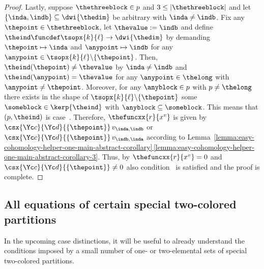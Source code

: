 \documentclass[pdftex]{sigma}
\numberwithin{equation}{section}
\begin{document}
{\begin{proof}
                                 Lastly, suppose  $\thethreeblock\in\thepartition$ and $3\leq|\thethreeblock|$ and let  $\{\inda,\indb\}\subseteq \dwi{\thedim}$  be arbitrary with $\inda\neq \indb$. Fix any $\thepoint\in\thethreeblock$, let $\thevalue:= \indb$ and define $\theind\funcdef\tsopx{\inlen}{\outlen}\to\dwi{\thedim}$ by demanding $\thepoint\mapsto \inda$ and $\anypoint\mapsto \indb$ for any $\anypoint\in\tsopx{\inlen}{\outlen}\backslash \{\thepoint\}$. Then, $\theind(\thepoint)\neq \thevalue$ by $\inda\neq\indb$ and $\theind(\anypoint)=\thevalue$ for any $\anypoint\in\thelong$ with $\anypoint\neq\thepoint$. Moreover, for any $\anyblock\in\thepartition$ with $\thepartition\neq\thelong$ there exists in the shape of $\tsopx{\inlen}{\outlen}\backslash \{\thepoint\}$ some   $\someblock\in\kerp{\theind}$ with $\anyblock\subseteq\someblock$. This means that $(\thepartition,\theind)$ is case~\scenariothree{}. Therefore, $\thefuncxx{\somerel}{\thetuple}$ is given by $\csx{\incol}{\outcol}{\{\thepoint\}}\,\thematx{\inda}{\indb}$ or      $\csx{\incol}{\outcol}{\{\thepoint\}}\,\thematx{\indb}{\inda}$ according to  Lem\-ma~\hyperref[lemma:easy-cohomology-helper-one-main-abstract-corollary-3]{\ref*{lemma:easy-cohomology-helper-one-main-abstract-corollary}\,\ref*{lemma:easy-cohomology-helper-one-main-abstract-corollary-3}}. Thus,  by $\thefuncxx{\somerel}{\thetuple}= 0$ and $\csx{\incol}{\outcol}{\{\thepoint\}}\neq 0$ also  condition~\conditionthree{} is satisfied and the proof is complete.
  \end{proof}
}



\subsection{All equations of certain special two-colored partitions}
\label{section:main-one-simplifications-fourth-simplification}
{
  \newcommand{\inlen}{k}
  \newcommand{\outlen}{\ell}
  \newcommand{\infree}{g}
  \newcommand{\outfree}{j}
  \newcommand{\altinfree}{g'}
  \newcommand{\altoutfree}{j'}
  \newcommand{\incol}{\Yc{c}}
  \newcommand{\outcol}{\Yc{d}}
  \newcommand{\thepartition}{p}
  \newcommand{\somerel}{r}
  \newcommand{\sometuple}{x}
    \newcommand{\themat}{v}
  \newcommand{\thematx}[2]{v_{#1,#2}}
  \newcommand{\thetuple}{x^\themat}
In the upcoming case distinctions, it will be useful to already  understand the conditions imposed by a small number of one- or two-elemental sets of special two-colored partitions.
}
\end{document}
